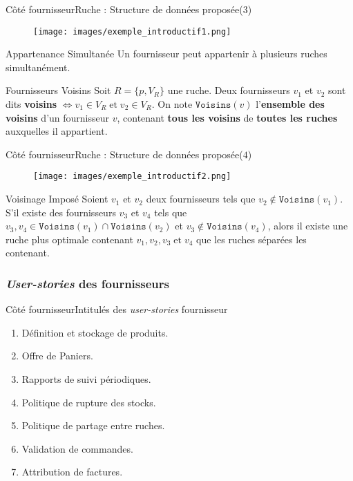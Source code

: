 \documentclass[usenames,dvipsnames]{beamer}
\begin{document}
\begin{frame}{Côté fournisseur}{Ruche : Structure de données proposée($3$)}
\begin{figure}[!ht]
  \centering
  \texttt{[image: images/exemple\_introductif1.png]}
\end{figure}

\begin{block}{Appartenance Simultanée}
Un fournisseur peut appartenir à plusieurs ruches simultanément.
\end{block}

\begin{block}{Fournisseurs Voisins}
Soit $R = \{p, V_R\}$ une ruche. Deux fournisseurs $v_1$ et $v_2$ sont dits \textbf{voisins} $\iff v_1 \in V_R\; \text{et}\; v_2 \in V_R$. On note $\texttt{Voisins}(v)$ l'\textbf{ensemble des voisins} d'un fournisseur $v$, contenant \textbf{tous les voisins} de \textbf{toutes les ruches} auxquelles il appartient.
\end{block}
\end{frame}

\begin{frame}{Côté fournisseur}{Ruche : Structure de données proposée($4$)}
\begin{figure}[!ht]
  \centering
  \texttt{[image: images/exemple\_introductif2.png]}
\end{figure}

\begin{block}{Voisinage Imposé}
Soient $v_1$ et $v_2$ deux fournisseurs tels que $v_2 \notin \texttt{Voisins}(v_1)$. S'il existe des fournisseurs $v_3$ et $v_4$ tels que $v_3, v_4 \in \texttt{Voisins}(v_1) \cap \texttt{Voisins}(v_2)$ et $v_3 \notin \texttt{Voisins}(v_4)$, alors il existe une ruche plus optimale contenant $v_1, v_2, v_3\; \text{et}\; v_4$ que les ruches séparées les contenant.
\end{block}
\end{frame}

\subsubsection*{\protect\textit{User-stories} des fournisseurs}
\begin{frame}{Côté fournisseur}{Intitulés des \textit{user-stories} fournisseur}
\begin{enumerate}
  \item Définition et stockage de produits.
  \item Offre de Paniers.
  \item Rapports de suivi périodiques.
  \item Politique de rupture des stocks.
  \item Politique de partage entre ruches.
  \item Validation de commandes.
  \item Attribution de factures.
\end{enumerate}
\end{frame}
\end{document}
